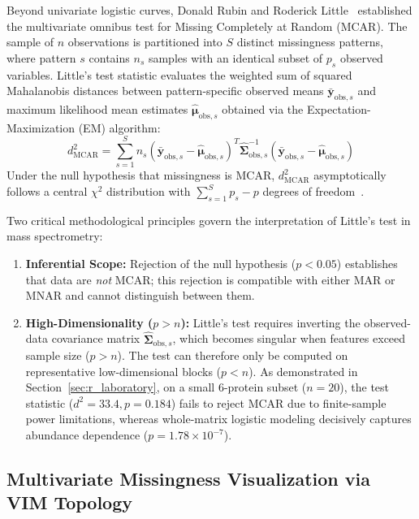\documentclass[11pt,oneside]{book}
\begin{document}
Beyond univariate logistic curves, Donald Rubin and Roderick Little~\cite{little1988test, templ2023visualization} established the multivariate omnibus test for Missing Completely at Random (MCAR). The sample of $n$ observations is partitioned into $S$ distinct missingness patterns, where pattern $s$ contains $n_s$ samples with an identical subset of $p_s$ observed variables. Little's test statistic evaluates the weighted sum of squared Mahalanobis distances between pattern-specific observed means $\bar{\mathbf{y}}_{\text{obs}, s}$ and maximum likelihood mean estimates $\hat{\boldsymbol{\mu}}_{\text{obs}, s}$ obtained via the Expectation-Maximization (EM) algorithm:
\begin{equation}
\label{eq:little_mcar}
d_{\text{MCAR}}^2 = \sum_{s=1}^S n_s \left( \bar{\mathbf{y}}_{\text{obs}, s} - \hat{\boldsymbol{\mu}}_{\text{obs}, s} \right)^T \hat{\boldsymbol{\Sigma}}_{\text{obs}, s}^{-1} \left( \bar{\mathbf{y}}_{\text{obs}, s} - \hat{\boldsymbol{\mu}}_{\text{obs}, s} \right)
\end{equation}
Under the null hypothesis that missingness is MCAR, $d_{\text{MCAR}}^2$ asymptotically follows a central $\chi^2$ distribution with $\sum_{s=1}^S p_s - p$ degrees of freedom~\cite{little1988test, templ2023visualization}.

Two critical methodological principles govern the interpretation of Little's test in mass spectrometry:
\begin{enumerate}
    \item \textbf{Inferential Scope:} Rejection of the null hypothesis ($p < 0.05$) establishes that data are \textit{not} MCAR; this rejection is compatible with either MAR or MNAR and cannot distinguish between them.
    \item \textbf{High-Dimensionality ($p > n$):} Little's test requires inverting the observed-data covariance matrix $\hat{\boldsymbol{\Sigma}}_{\text{obs}, s}$, which becomes singular when features exceed sample size ($p > n$). The test can therefore only be computed on representative low-dimensional blocks ($p < n$). As demonstrated in Section~\ref{sec:r_laboratory}, on a small 6-protein subset ($n=20$), the test statistic ($d^2 = 33.4, p = 0.184$) fails to reject MCAR due to finite-sample power limitations, whereas whole-matrix logistic modeling decisively captures abundance dependence ($p = 1.78 \times 10^{-7}$).
\end{enumerate}

\subsection{Multivariate Missingness Visualization via VIM Topology}
\end{document}
